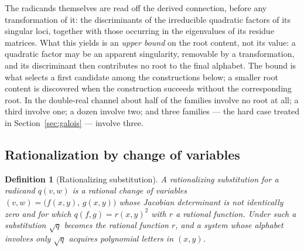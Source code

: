 \documentclass[11pt]{article}
\newtheorem{definition}{Definition}[section]
\begin{document}
The radicands themselves are read off the derived connection, before
any transformation of it: the discriminants of the irreducible
quadratic factors of its singular loci, together with those occurring
in the eigenvalues of its residue matrices.  What this yields is an
\emph{upper bound} on the root content, not its value: a quadratic
factor may be an apparent singularity, removable by a transformation,
and its discriminant then contributes no root to the final alphabet.
The bound is what selects a first candidate among the constructions
below; a smaller root content is discovered when the construction
succeeds without the corresponding root.  In the double-real channel
about half of the families involve no root at all; a third involve
one; a dozen involve two; and three families --- the hard case
treated in Section~\ref{sec:galois} --- involve three.

\subsection{Rationalization by change of variables}

\begin{definition}[Rationalizing substitution]
A \emph{rationalizing substitution} for a radicand $q(v,w)$ is a
rational change of variables $(v,w) = \big(f(x,y),\,g(x,y)\big)$
whose Jacobian determinant is not identically zero and for which
$q(f,g) = r(x,y)^2$ with $r$ a
rational function.  Under such a substitution $\sqrt q$ becomes
the rational function $r$, and a system whose alphabet involves only
$\sqrt q$ acquires polynomial letters in $(x,y)$.
\end{definition}
\end{document}
